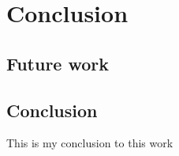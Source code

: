 \chapter{Conclusion}\label{ch:conclusion}
\section{Future work}
\section{Conclusion}

This is my conclusion to this work